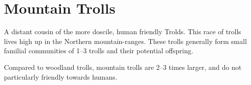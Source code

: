 \section{Mountain Trolls}\label{sec:trolls}
A distant cousin of the more doscile, human friendly Trolds.
This race of trolls lives high up in the Northern mountain-ranges.
These trolls generally form small familial communities of 1--3 trolls and their potential offspring.

Compared to woodland trolls, mountain trolls are 2--3 times larger, and do not particularly friendly towards humans.